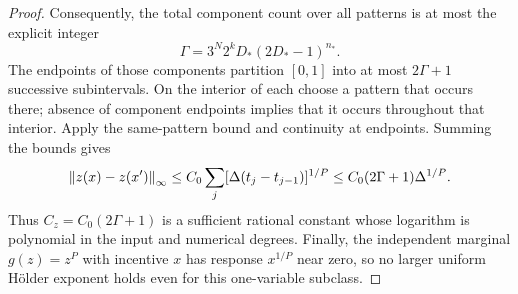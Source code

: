 \begin{proof}
Consequently, the total component count over all patterns is at most the
explicit integer
\[
 \Gamma=3^N2^kD_*(2D_*-1)^{n_*}.
\]
The endpoints of those components partition $[0,1]$ into at most
$2\Gamma+1$ successive subintervals. On the interior of each choose a
pattern that occurs there; absence of component endpoints implies that
it occurs throughout that interior. Apply the same-pattern bound and
continuity at endpoints. Summing the bounds gives
\[
 \left\lVert z(x)-z(x')\right\rVert_\infty
 \le C_0\sum_j[\Delta(t_j-t_{j-1})]^{1/P}
 \le C_0(2\Gamma+1)\Delta^{1/P}.
\]
Thus $C_z=C_0(2\Gamma+1)$ is a sufficient rational constant whose
logarithm is polynomial in the input and numerical degrees. Finally, the independent marginal $g(z)=z^P$ with
incentive $x$ has response $x^{1/P}$ near zero, so no larger uniform
H\"older exponent holds even for this one-variable subclass.
\end{proof}
